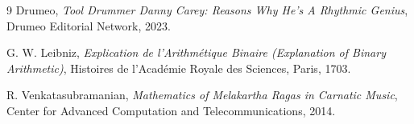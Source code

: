 \documentclass[11pt,twocolumn]{article}
\begin{document}
\begin{thebibliography}{9}
Drumeo, \emph{Tool Drummer Danny Carey: Reasons Why He's A Rhythmic Genius}, Drumeo Editorial Network, 2023.

G. W. Leibniz, \emph{Explication de l'Arithmétique Binaire (Explanation of Binary Arithmetic)}, Histoires de l'Académie Royale des Sciences, Paris, 1703.

R. Venkatasubramanian, \emph{Mathematics of Melakartha Ragas in Carnatic Music}, Center for Advanced Computation and Telecommunications, 2014.
\end{thebibliography}
\end{document}
